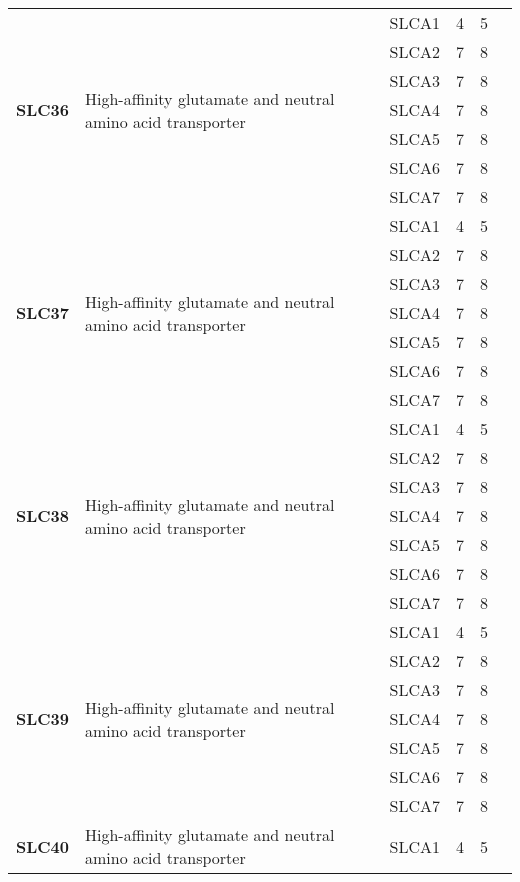 \documentclass[12pt]{report}
\begin{document}
\begin{center}
\begin{longtable}{|p{1.5cm}|p{3.2cm}|p{1.9cm}|p{1.65cm}|p{3cm}|p{3cm}|}
\hline
\multirow{7}{1.5cm}{\textbf{SLC36}} & \multirow{7}{4cm}{High-affinity glutamate and neutral amino acid transporter} & SLCA1 & 4 & 5\\ 
\cline{3-6}
&&SLCA2&7 & 8&\\ 
\cline{3-6}
&&SLCA3&7 & 8&\\ 
\cline{3-6}
&&SLCA4&7 & 8&\\ 
\cline{3-6}
&&SLCA5&7 & 8&\\ 
\cline{3-6}
&&SLCA6&7 & 8&\\ 
\cline{3-6}
&&SLCA7&7 & 8&\\ 
\hline
\multirow{7}{1.5cm}{\textbf{SLC37}} & \multirow{7}{4cm}{High-affinity glutamate and neutral amino acid transporter} & SLCA1 & 4 & 5\\ 
\cline{3-6}
&&SLCA2&7 & 8&\\ 
\cline{3-6}
&&SLCA3&7 & 8&\\ 
\cline{3-6}
&&SLCA4&7 & 8&\\ 
\cline{3-6}
&&SLCA5&7 & 8&\\ 
\cline{3-6}
&&SLCA6&7 & 8&\\ 
\cline{3-6}
&&SLCA7&7 & 8&\\ 
\hline
\multirow{7}{1.5cm}{\textbf{SLC38}} & \multirow{7}{4cm}{High-affinity glutamate and neutral amino acid transporter} & SLCA1 & 4 & 5\\ 
\cline{3-6}
&&SLCA2&7 & 8&\\ 
\cline{3-6}
&&SLCA3&7 & 8&\\ 
\cline{3-6}
&&SLCA4&7 & 8&\\ 
\cline{3-6}
&&SLCA5&7 & 8&\\ 
\cline{3-6}
&&SLCA6&7 & 8&\\ 
\cline{3-6}
&&SLCA7&7 & 8&\\ 
\hline
\multirow{7}{1.5cm}{\textbf{SLC39}} & \multirow{7}{4cm}{High-affinity glutamate and neutral amino acid transporter} & SLCA1 & 4 & 5\\ 
\cline{3-6}
&&SLCA2&7 & 8&\\ 
\cline{3-6}
&&SLCA3&7 & 8&\\ 
\cline{3-6}
&&SLCA4&7 & 8&\\ 
\cline{3-6}
&&SLCA5&7 & 8&\\ 
\cline{3-6}
&&SLCA6&7 & 8&\\ 
\cline{3-6}
&&SLCA7&7 & 8&\\ 
\hline
\multirow{7}{1.5cm}{\textbf{SLC40}} & \multirow{7}{4cm}{High-affinity glutamate and neutral amino acid transporter} & SLCA1 & 4 & 5\\ 

\end{longtable}
\end{center}
\end{document}
